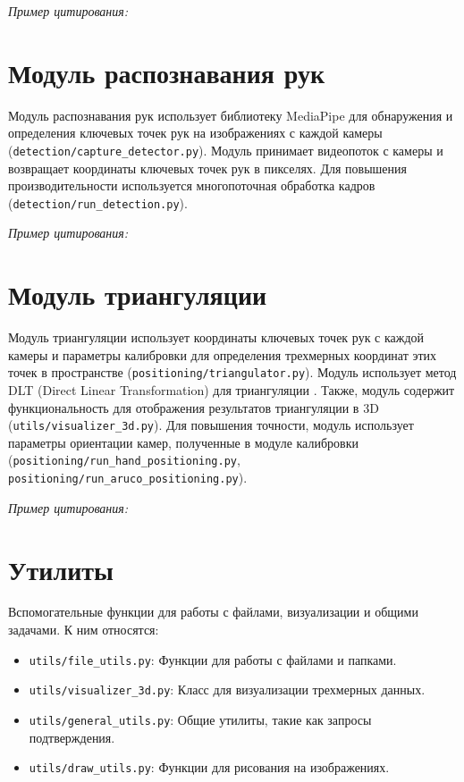 \documentclass[12pt, a4paper]{article}
\begin{document}
\textit{Пример цитирования:} \cite{bradski2000opencv}

\section{Модуль распознавания рук}

Модуль распознавания рук использует библиотеку MediaPipe \cite{lugaresi2019mediapipe} для обнаружения и определения ключевых точек рук на изображениях с каждой камеры (\texttt{detection/capture\_detector.py}). Модуль принимает видеопоток с камеры и возвращает координаты ключевых точек рук в пикселях. Для повышения производительности используется многопоточная обработка кадров (\texttt{detection/run\_detection.py}).

\textit{Пример цитирования:} \cite{mediapipe}

\section{Модуль триангуляции}

Модуль триангуляции использует координаты ключевых точек рук с каждой камеры и параметры калибровки для определения трехмерных координат этих точек в пространстве (\texttt{positioning/triangulator.py}). Модуль использует метод DLT (Direct Linear Transformation) для триангуляции \cite{hartley2003multiple}. Также, модуль содержит функциональность для отображения результатов триангуляции в 3D (\texttt{utils/visualizer\_3d.py}). Для повышения точности, модуль использует параметры ориентации камер, полученные в модуле калибровки (\texttt{positioning/run\_hand\_positioning.py}, \texttt{positioning/run\_aruco\_positioning.py}).

\textit{Пример цитирования:} \cite{faugeras1993three}

\section{Утилиты}

Вспомогательные функции для работы с файлами, визуализации и общими задачами. К ним относятся:
\begin{itemize}
    \item \texttt{utils/file\_utils.py}: Функции для работы с файлами и папками.
    \item \texttt{utils/visualizer\_3d.py}: Класс для визуализации трехмерных данных.
    \item \texttt{utils/general\_utils.py}: Общие утилиты, такие как запросы подтверждения.
    \item \texttt{utils/draw\_utils.py}: Функции для рисования на изображениях.
\end{itemize}
\end{document}
